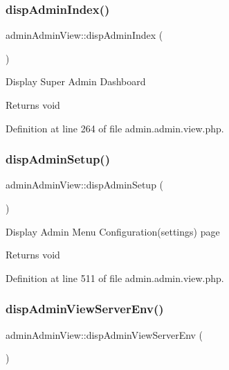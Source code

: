 \subsubsection{\texorpdfstring{disp\+Admin\+Index()}{dispAdminIndex()}}
{\footnotesize\ttfamily admin\+Admin\+View\+::disp\+Admin\+Index (\begin{DoxyParamCaption}{ }\end{DoxyParamCaption})}

Display Super Admin Dashboard \begin{DoxyReturn}{Returns}
void 
\end{DoxyReturn}


Definition at line 264 of file admin.\+admin.\+view.\+php.

\mbox{\label{classadminAdminView_acfa4a5d1209080974ca5fd15d04565e9}} 
\subsubsection{\texorpdfstring{disp\+Admin\+Setup()}{dispAdminSetup()}}
{\footnotesize\ttfamily admin\+Admin\+View\+::disp\+Admin\+Setup (\begin{DoxyParamCaption}{ }\end{DoxyParamCaption})}

Display Admin Menu Configuration(settings) page \begin{DoxyReturn}{Returns}
void 
\end{DoxyReturn}


Definition at line 511 of file admin.\+admin.\+view.\+php.

\mbox{\label{classadminAdminView_a6b110bb8ccba975a670fdfbe559f7118}} 
\subsubsection{\texorpdfstring{disp\+Admin\+View\+Server\+Env()}{dispAdminViewServerEnv()}}
{\footnotesize\ttfamily admin\+Admin\+View\+::disp\+Admin\+View\+Server\+Env (\begin{DoxyParamCaption}{ }\end{DoxyParamCaption})}

